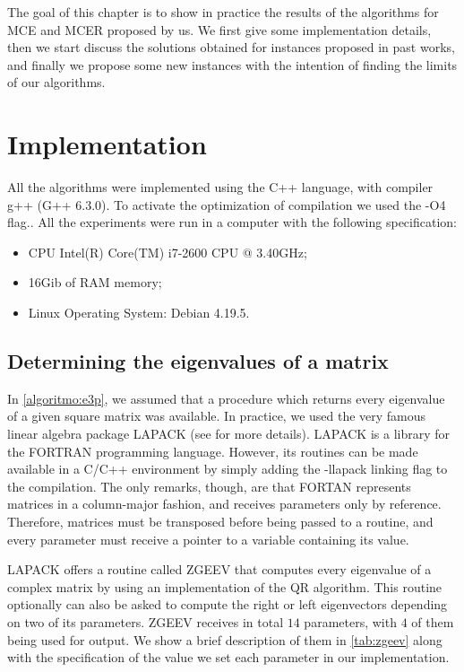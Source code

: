 The goal of this chapter is to show in practice the results of the algorithms for MCE and MCER proposed by us. We first give some implementation details, then we start discuss the solutions obtained for instances proposed in past works, and finally we propose some new instances with the intention of finding the limits of our algorithms.

\section{Implementation}

All the algorithms were implemented using the C++ language, with compiler g++ (G++ 6.3.0). To activate the optimization of compilation we used the -O4 flag.. All the experiments were run in a computer with the following specification:
\begin{itemize}
	\item CPU Intel(R) Core(TM) i7-2600 CPU @ 3.40GHz;
	\item 16Gib of RAM memory;
	\item Linux Operating System: Debian 4.19.5.
\end{itemize}
\subsection{Determining the eigenvalues of a matrix}

In \autoref{algoritmo:e3p}, we assumed that a procedure which returns every eigenvalue of a given square matrix was available. In practice, we used the very famous linear algebra package LAPACK (see  for more details).
LAPACK is a library for the FORTRAN programming language. However, its routines can be made available in a C/C++ environment by simply adding the -llapack linking flag to the compilation. The only remarks, though, are that FORTAN represents matrices in a column-major fashion, and receives parameters only by reference. Therefore, matrices must be transposed before being passed to a routine, and every parameter must receive a pointer to a variable containing its value.

LAPACK offers a routine called ZGEEV that computes every eigenvalue of a complex matrix by using an implementation of the QR algorithm. 
This routine optionally can also be asked to compute the right or left eigenvectors depending on two of its parameters. 
ZGEEV receives in total $14$ parameters, with $4$ of them being used for output. We show a brief description of them in \autoref{tab:zgeev} along with the specification of the value we set each parameter in our implementation.

